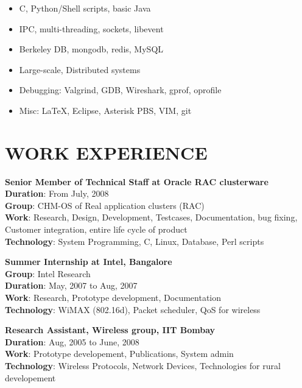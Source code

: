 \documentclass{res}
\begin{document}
\begin{resume}
					  \begin{itemize}
					  \item C, Python/Shell scripts, basic Java
					  \item IPC, multi-threading, sockets, libevent
					  \item Berkeley DB, mongodb, redis, MySQL
					  \item Large-scale, Distributed systems
				          \item Debugging: Valgrind, GDB, Wireshark, gprof, oprofile
					  \item Misc: \LaTeX, Eclipse, Asterisk PBS, VIM, git
					  \end{itemize}

					  \section{WORK EXPERIENCE}
					  {\bf Senior Member of Technical Staff at Oracle RAC clusterware}
					  \\{\bf Duration}:  From July, 2008\\
					  {\bf Group}: CHM-OS of Real application clusters (RAC)\\
					  {\bf Work}: Research, Design, Development, Testcases, Documentation, bug fixing, Customer integration, entire life cycle of product\\
					  {\bf Technology}: System Programming, C, Linux, Database, Perl scripts

					  {\bf Summer Internship at Intel, Bangalore}\\
					  {\bf Group}: Intel Research
					  \\{\bf Duration}: May, 2007 to Aug, 2007
					  \\{\bf Work}: Research, Prototype development, Documentation
					  \\{\bf Technology}: WiMAX (802.16d), Packet scheduler, QoS for wireless


					  {\bf Research Assistant, Wireless group, IIT Bombay}
					  \\{\bf Duration}: Aug, 2005 to June, 2008
					  \\{\bf Work}: Prototype developement, Publications, System admin
					  \\{\bf Technology}: Wireless Protocols, Network Devices, Technologies for rural developement


\end{resume}
\end{document}
